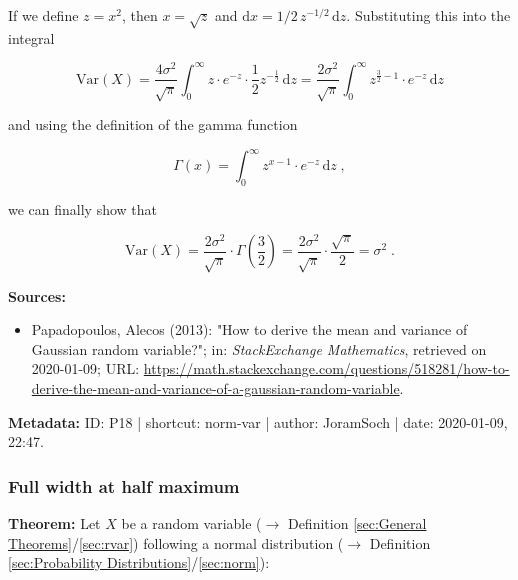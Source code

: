 \documentclass[a4paper,12pt,twoside]{book}
\begin{document}
If we define $z = x^2$, then $x = \sqrt{z}$ and $\mathrm{d}x = 1/2 \, z^{-1/2} \, \mathrm{d}z$. Substituting this into the integral

\begin{equation} \label{eq:norm-var-norm-var-s5}
\mathrm{Var}(X) = \frac{4 \sigma^2}{\sqrt{\pi}} \int_{0}^{\infty} z \cdot e^{-z} \cdot \frac{1}{2} z^{-\frac{1}{2}} \, \mathrm{d}z = \frac{2 \sigma^2}{\sqrt{\pi}} \int_{0}^{\infty} z^{\frac{3}{2}-1} \cdot e^{-z} \, \mathrm{d}z
\end{equation}

and using the definition of the gamma function

\begin{equation} \label{eq:norm-var-gam-fct}
\Gamma(x) = \int_{0}^{\infty} z^{x-1} \cdot e^{-z} \, \mathrm{d}z \; ,
\end{equation}

we can finally show that

\begin{equation} \label{eq:norm-var-norm-var-s6}
\mathrm{Var}(X) = \frac{2 \sigma^2}{\sqrt{\pi}} \cdot \Gamma\!\left(\frac{3}{2}\right) = \frac{2 \sigma^2}{\sqrt{\pi}} \cdot \frac{\sqrt{\pi}}{2} = \sigma^2 \; .
\end{equation}



\vspace{1em}
\textbf{Sources:}
\begin{itemize}
\item Papadopoulos, Alecos (2013): "How to derive the mean and variance of Gaussian random variable?"; in: \textit{StackExchange Mathematics}, retrieved on 2020-01-09; URL: \url{https://math.stackexchange.com/questions/518281/how-to-derive-the-mean-and-variance-of-a-gaussian-random-variable}.
\end{itemize}


\vspace{1em}
\textbf{Metadata:} ID: P18 | shortcut: norm-var | author: JoramSoch | date: 2020-01-09, 22:47.
\vspace{1em}



\subsubsection[\textbf{Full width at half maximum}]{Full width at half maximum} \label{sec:norm-fwhm}
\setcounter{equation}{0}

\textbf{Theorem:} Let $X$ be a random variable ($\rightarrow$ Definition \ref{sec:General Theorems}/\ref{sec:rvar}) following a normal distribution ($\rightarrow$ Definition \ref{sec:Probability Distributions}/\ref{sec:norm}):
\end{document}
